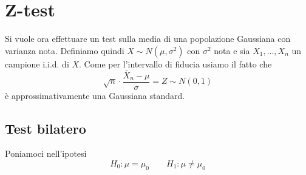 \section{Z-test}
Si vuole ora effettuare un test sulla media di una popolazione Gaussiana con varianza nota.
Definiamo quindi $X \sim N(\mu, \sigma^2)$ con $\sigma^2$ nota e sia $X_1, \dots, X_n$ un campione
i.i.d. di $X$. Come per l'intervallo di fiducia usiamo il fatto che
\[ \sqrt{n} \cdot \frac{\bar{X}_n - \mu}{\sigma} = Z \sim N(0,1) \]
è approssimativamente una Gaussiana standard.

\subsection{Test bilatero}
Poniamoci nell'ipotesi
\[ H_0: \mu = \mu_0 \qquad H_1: \mu \neq \mu_0 \]

